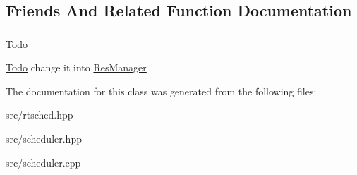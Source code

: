 \subsection{Friends And Related Function Documentation}
\subsubsection[{\texorpdfstring{P\+I\+R\+Manager}{PIRManager}}]{\hspace{0.3cm}{\ttfamily [friend]}}\hypertarget{classRTSim_1_1Scheduler_aa1f247653b81e44ca2fc343b8aa88e13}{}\label{classRTSim_1_1Scheduler_aa1f247653b81e44ca2fc343b8aa88e13}
\begin{DoxyRefDesc}{Todo}
\item[\hyperlink{todo__todo000011}{Todo}]change it into \hyperlink{classRTSim_1_1ResManager}{Res\+Manager} \end{DoxyRefDesc}


The documentation for this class was generated from the following files\+:\begin{DoxyCompactItemize}
\item 
src/rtsched.\+hpp\item 
src/scheduler.\+hpp\item 
src/scheduler.\+cpp\end{DoxyCompactItemize}
